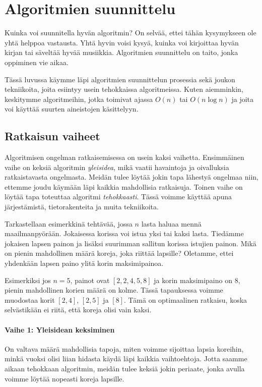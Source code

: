 \chapter{Algoritmien suunnittelu}

Kuinka voi suunnitella hyvän algoritmin?
On selvää, ettei tähän kysymykseen ole yhtä helppoa vastausta.
Yhtä hyvin voisi kysyä, kuinka voi kirjoittaa hyvän kirjan
tai säveltää hyvää musiikkia.
Algoritmien suunnittelu on taito, jonka oppiminen vie aikaa.

Tässä luvussa käymme läpi algoritmien suunnittelun prosessia
sekä joukon tekniikoita, joita esiintyy usein tehokkaissa algoritmeissa.
Kuten aiemminkin, keskitymme algoritmeihin,
jotka toimivat ajassa $O(n)$ tai $O(n \log n)$ ja
joita voi käyttää suurten aineistojen käsittelyyn.

\section{Ratkaisun vaiheet}

Algoritmisen ongelman ratkaisemisessa on usein kaksi vaihetta.
Ensimmäinen vaihe on keksiä algoritmin \emph{yleisidea},
mikä vaatii havaintoja ja oivalluksia ratkaistavasta ongelmasta.
Meidän tulee löytää jokin tapa lähestyä ongelmaa niin,
ettemme joudu käymään läpi kaikkia mahdollisia ratkaisuja.
Toinen vaihe on löytää tapa toteuttaa algoritmi \emph{tehokkaasti}.
Tässä voimme käyttää apuna järjestämistä, tietorakenteita
ja muita tekniikoita.

Tarkastellaan esimerkkinä tehtävää,
jossa $n$ lasta haluaa mennä maailmanpyörään.
Jokaisessa korissa voi istua yksi tai kaksi lasta.
Tiedämme jokaisen lapsen painon ja lisäksi 
suurimman sallitun korissa istujien painon.
Mikä on pienin mahdollinen määrä koreja,
joka riittää lapsille?
Oletamme, ettei yhdenkään lapsen paino ylitä
korin maksimipainoa.

Esimerkiksi jos $n=5$, painot ovat $[2,2,4,5,8]$
ja korin maksimipaino on $8$,
pienin mahdollinen korien määrä on kolme.
Tässä tapauksessa voimme muodostaa korit
$[2,4]$, $[2,5]$ ja $[8]$.
Tämä on optimaalinen ratkaisu, koska selvästikään
ei riitä, että koreja olisi vain kaksi.

\subsubsection{Vaihe 1: Yleisidean keksiminen}

On valtava määrä mahdollisia tapoja,
miten voimme sijoittaa lapsia koreihin,
minkä vuoksi olisi liian hidasta käydä läpi
kaikkia vaihtoehtoja.
Jotta saamme aikaan tehokkaan algoritmin,
meidän tulee keksiä jokin periaate,
jonka avulla voimme löytää nopeasti koreja lapsille.

